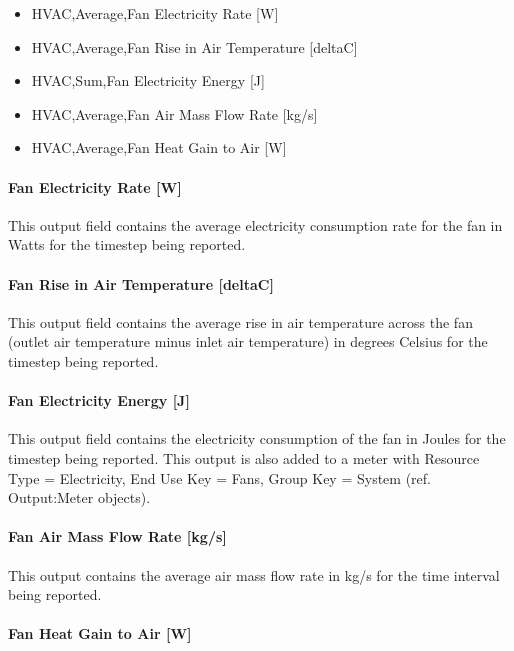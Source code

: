 \begin{itemize}
\item
  HVAC,Average,Fan Electricity Rate {[}W{]}
\item
  HVAC,Average,Fan Rise in Air Temperature {[}deltaC{]}
\item
  HVAC,Sum,Fan Electricity Energy {[}J{]}
\item
  HVAC,Average,Fan Air Mass Flow Rate {[}kg/s{]}
\item
  HVAC,Average,Fan Heat Gain to Air {[}W{]}
\end{itemize}

\paragraph{Fan Electricity Rate {[}W{]}}\label{fan-electric-power-w-4}

This output field contains the average electricity consumption rate for the fan in Watts for the timestep being reported.

\paragraph{Fan Rise in Air Temperature {[}deltaC{]}}\label{fan-rise-in-air-temperature-deltac-4}

This output field contains the average rise in air temperature across the fan (outlet air temperature minus inlet air temperature) in degrees Celsius for the timestep being reported.

\paragraph{Fan Electricity Energy {[}J{]}}\label{fan-electric-energy-j-4}

This output field contains the electricity consumption of the fan in Joules for the timestep being reported. This output is also added to a meter with Resource Type = Electricity, End Use Key = Fans, Group Key = System (ref. Output:Meter objects).

\paragraph{Fan Air Mass Flow Rate {[}kg/s{]}}\label{fan-air-mass-flow-kgs-4}

This output contains the average air mass flow rate in kg/s for the time interval being reported.

\paragraph{Fan Heat Gain to Air {[}W{]}}\label{fan-heat-gain-to-air-w-4}

